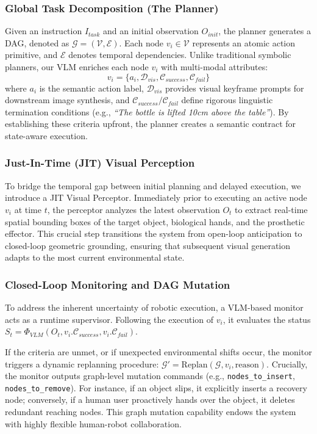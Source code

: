 \documentclass[letterpaper, 10 pt, conference]{ieeeconf}  %
\begin{document}
\subsubsection{Global Task Decomposition (The Planner)}
Given an instruction $I_{task}$ and an initial observation $O_{init}$, the planner generates a DAG, denoted as $\mathcal{G} = (\mathcal{V}, \mathcal{E})$. Each node $v_i \in \mathcal{V}$ represents an atomic action primitive, and $\mathcal{E}$ denotes temporal dependencies. Unlike traditional symbolic planners, our VLM enriches each node $v_i$ with multi-modal attributes:
\begin{equation}
    v_i = \{ a_i, \mathcal{D}_{vis}, \mathcal{C}_{success}, \mathcal{C}_{fail} \}
\end{equation}
where $a_i$ is the semantic action label, $\mathcal{D}_{vis}$ provides visual keyframe prompts for downstream image synthesis, and $\mathcal{C}_{success} / \mathcal{C}_{fail}$ define rigorous linguistic termination conditions (e.g., \textit{``The bottle is lifted 10cm above the table''}). By establishing these criteria upfront, the planner creates a semantic contract for state-aware execution.

\subsubsection{Just-In-Time (JIT) Visual Perception}
To bridge the temporal gap between initial planning and delayed execution, we introduce a JIT Visual Perceptor. Immediately prior to executing an active node $v_i$ at time $t$, the perceptor analyzes the latest observation $O_t$ to extract real-time spatial bounding boxes of the target object, biological hands, and the prosthetic effector. This crucial step transitions the system from open-loop anticipation to closed-loop geometric grounding, ensuring that subsequent visual generation adapts to the most current environmental state.

\subsubsection{Closed-Loop Monitoring and DAG Mutation}
To address the inherent uncertainty of robotic execution, a VLM-based monitor acts as a runtime supervisor. Following the execution of $v_i$, it evaluates the status $S_t = \Phi_{VLM}(O_t, v_i.\mathcal{C}_{success}, v_i.\mathcal{C}_{fail})$. 

If the criteria are unmet, or if unexpected environmental shifts occur, the monitor triggers a dynamic replanning procedure: $\mathcal{G}' = \text{Replan}(\mathcal{G}, v_i, \text{reason})$. Crucially, the monitor outputs graph-level mutation commands (e.g., \texttt{nodes\_to\_insert}, \texttt{nodes\_to\_remove}). For instance, if an object slips, it explicitly inserts a recovery node; conversely, if a human user proactively hands over the object, it deletes redundant reaching nodes. This graph mutation capability endows the system with highly flexible human-robot collaboration.
\end{document}
